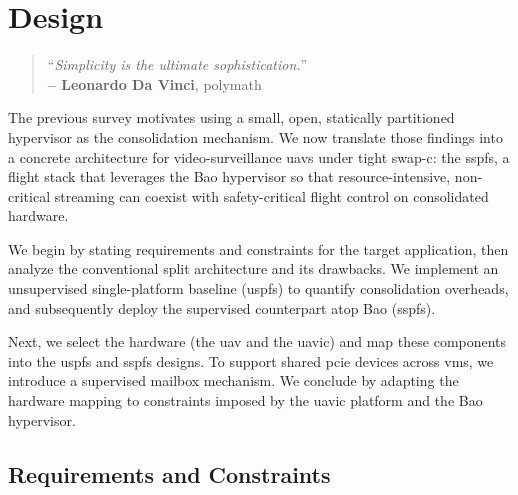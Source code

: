 %
\chapter{Design}%
\label{ch:design}
\begin{quote}
\begin{flushright}
``\emph{Simplicity is the ultimate sophistication.}'' \\
\textbf{-- Leonardo Da Vinci}, polymath
\end{flushright}
\end{quote}

The previous survey motivates using a small, open, statically partitioned
hypervisor as the consolidation mechanism. We now translate those findings into
a concrete architecture for video-surveillance \glspl{uav} under tight \gls{swap-c}:
the \gls{sspfs}, a flight stack that leverages the Bao hypervisor so that
resource-intensive, non-critical streaming can coexist with safety-critical
flight control on consolidated hardware.

We begin by stating requirements and constraints for the target application, then
analyze the conventional split architecture and its drawbacks. We implement an
unsupervised single-platform baseline (\gls{uspfs}) to quantify consolidation
overheads, and subsequently deploy the supervised counterpart atop Bao
(\gls{sspfs}).

Next, we select the hardware (the \gls{uav} and the \gls{uavic}) and map these
components into the \gls{uspfs} and \gls{sspfs} designs. To support shared
\gls{pcie} devices across \glspl{vm}, we introduce a supervised mailbox
mechanism. We conclude by adapting the hardware mapping to constraints imposed
by the \gls{uavic} platform and the Bao hypervisor.

\section{Requirements and Constraints}
\label{sec:req-sec}

